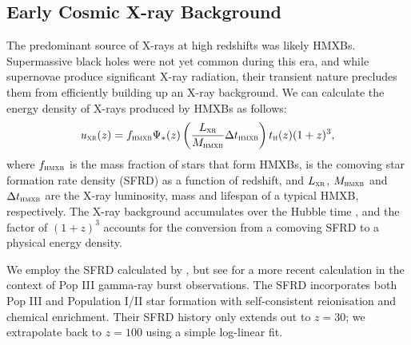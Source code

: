 \documentclass[../thesis.tex]{subfiles}
\begin{document}
\subsection{Early Cosmic X-ray Background}
\label{HMXB}
The predominant source of X-rays at high redshifts was likely HMXBs.
Supermassive black holes were not yet common during this era, and
while supernovae produce significant X-ray radiation, their transient
nature precludes them from efficiently building up an X-ray
background. We can calculate the energy density \uxr
of X-rays produced by HMXBs as follows:
\begin{equation}
  {u}_{\textsc{xr}}(z) = f_{\textsc{hmxb}} \Psi_{*}(z) \left(\frac{L_{\textsc{xr}}}{M_{\textsc{hmxb}}}\Delta t_{\textsc{hmxb}}\right) 
  {t}_{\textsc{h}}(z) (1+z)^3,
\end{equation}
where $f_{\textsc{hmxb}}$ is the mass fraction of stars that form HMXBs, \sfrz
is the comoving star formation rate density (SFRD) as a function of
redshift, and $L_{\textsc{xr}}$, $M_{\textsc{hmxb}}$ and $\Delta t_{\textsc{hmxb}}$ are the
X-ray luminosity, mass and lifespan of a typical HMXB, respectively.  The
X-ray background accumulates over the Hubble time \tH, and the factor
of $(1+z)^3$ accounts for the conversion from a comoving SFRD to a
physical energy density. 

We employ the SFRD calculated by \citet{GreifBromm2006}, but see \citet{Campisietal2011} for a more recent calculation in the context of Pop III gamma-ray burst observations. The \citet{GreifBromm2006} SFRD incorporates both Pop III and Population I/II star formation with self-consistent reionisation and chemical enrichment.  Their SFRD history only extends out to $z=30$; we
extrapolate back to $z=100$ using a simple log-linear fit. 
\end{document}

